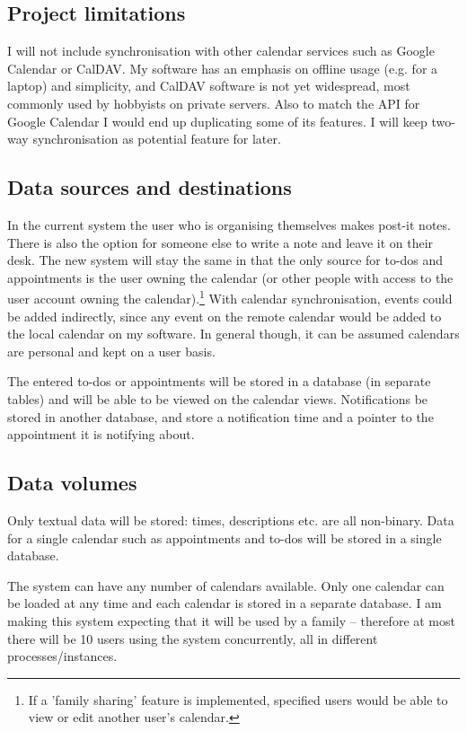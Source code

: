 \subsection{Project limitations}

I will not include synchronisation with other calendar services such as Google
Calendar or CalDAV. My software has an emphasis on offline usage (e.g. for a
laptop) and simplicity, and CalDAV software is not yet widespread, most commonly
used by hobbyists on private servers. Also to match the API for Google Calendar
I would end up duplicating some of its features. I will keep two-way
synchronisation as potential feature for later.


\subsection{Data sources and destinations}

In the current system the user who is organising themselves makes post-it notes.
There is also the option for someone else to write a note and leave it on their
desk. The new system will stay the same in that the only source for to-dos and
appointments is the user owning the calendar (or other people with access to the
user account owning the calendar).\footnote{If a 'family sharing' feature is
implemented, specified users would be able to view or edit another user's
calendar.} With calendar synchronisation, events could be added indirectly,
since any event on the remote calendar would be added to the local calendar on
my software. In general though, it can be assumed calendars are personal and
kept on a user basis.

The entered to-dos or appointments will be stored in a database (in separate
tables) and will be able to be viewed on the calendar views. Notifications be
stored in another database, and store a notification time and a pointer to the
appointment it is notifying about.


\subsection{Data volumes}

Only textual data will be stored: times, descriptions etc. are all
non-binary. Data for a single calendar such as appointments and to-dos will be
stored in a single database.

The system can have any number of calendars available. Only one calendar can be
loaded at any time and each calendar is stored in a separate database. I am
making this system expecting that it will be used by a family -- therefore at
most there will be 10 users using the system concurrently, all in different
processes/instances.

